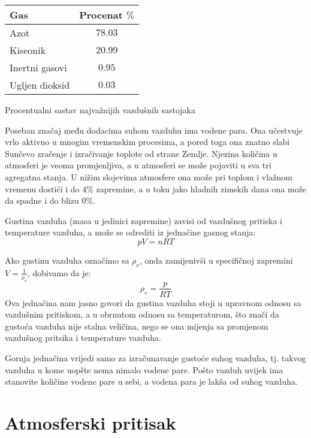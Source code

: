 	\begin{margintable}[0pt]
		\footnotesize%
		\begin{center}
			\begin{tabular}{lc}
				\toprule
				Gas & Procenat $ \% $ \\
				\midrule
				Azot     & $78.03$  \\
				Kiseonik      & $20.99$  \\
				Inertni gasovi     & $0.95$  \\
				Ugljen dioksid    & $0.03$  \\
			
				\bottomrule
			\end{tabular}
		\end{center}
		\caption{Procentualni sastav najvažnijih vazdušnih sastojaka}
		\label{tab:sastav-atm}
	\end{margintable}


Poseban značaj među dodacima suhom vazduhu ima vodene para. Ona učestvuje vrlo aktivno u mnogim vremenskim procesima, a pored toga ona znatno slabi Sunčevo zračenje i izračivanje toplote od strane Zemlje. Njezina količina u atmosferi je veoma promjenljiva, a u atmosferi se može pojaviti u sva tri agregatna stanja. U nižim slojevima atmosfere ona može pri toplom i vlažnom vremenu dostići i do $4\%$ zapremine, a u toku jako hladnih zimskih dana ona može da spadne i do blizu $0\%$.

Gustina vazduha (masa u jedinici zapremine) zavisi od vazdušnog pritiska i temperature vazduha, a može se odrediti iz jednačine gasnog stanja: 
$$ pV = nRT $$

Ako gustinu vazduha označimo sa $ \rho_v $, onda zamijenivši u specifičnoj zapremini $ V = \frac{1}{\rho_v}
$, dobivamo da je: 
$$ \rho_v = \frac{p}{RT} $$
Ova jednačina nam jasno govori da gustina vazduha stoji u upravnom odnosu sa vazdušnim pritiskom, a u obrnutom odnosu sa temperaturom, što znači da gustoća vazduha nije stalna veličina, nego se ona mijenja sa promjenom vazdušnog pritsika i temperature vazduha.\\

Gornja jednačina vrijedi samo za izračunavanje gustoće suhog vazduha, tj. takvog vazduha u kome uopšte nema nimalo vodene pare. Pošto vazduh uvijek ima stanovite količine vodene pare u sebi, a vodena para je lakša od suhog vazduha.
\section{Atmosferski pritisak}